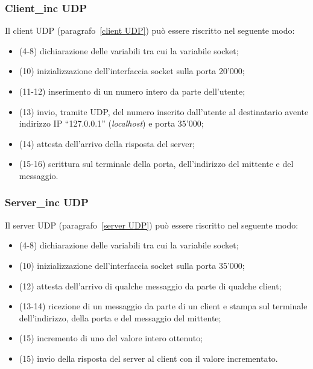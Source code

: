 \documentclass[a4paper]{article}
\newcommand{\dquotes}[1]{``#1''}
\begin{document}
	\subsubsection{Client\_inc UDP}\label{client_inc UDP}
	
	Il client UDP (paragrafo~\ref{client UDP}) può essere riscritto nel seguente modo:
	
	\begin{itemize}
		\item (4-8) dichiarazione delle variabili tra cui la variabile socket;
		
		\item (10) inizializzazione dell'interfaccia socket sulla porta 20'000;
		
		\item (11-12) inserimento di un numero intero da parte dell'utente;
		
		\item (13) invio, tramite UDP, del numero inserito dall'utente al destinatario avente indirizzo IP \dquotes{127.0.0.1} (\emph{localhost}) e porta 35'000;
		
		\item (14) attesta dell'arrivo della risposta del server;
		
		\item (15-16) scrittura sul terminale della porta, dell'indirizzo del mittente e del messaggio.
	\end{itemize}\newpage

	\subsubsection{Server\_inc UDP}\label{server_inc UDP}
	
	Il server UDP (paragrafo~\ref{server UDP}) può essere riscritto nel seguente modo:
	
	\begin{itemize}
		\item (4-8) dichiarazione delle variabili tra cui la variabile socket;
		
		\item (10) inizializzazione dell'interfaccia socket sulla porta 35'000;
		
		\item (12) attesta dell'arrivo di qualche messaggio da parte di qualche client;
		
		\item (13-14) ricezione di un messaggio da parte di un client e stampa sul terminale dell'indirizzo, della porta e del messaggio del mittente;
		
		\item (15) incremento di uno del valore intero ottenuto;
		
		\item (15) invio della risposta del server al client con il valore incrementato.
	\end{itemize}\newpage
\end{document}
